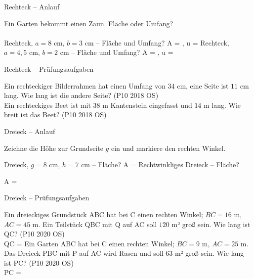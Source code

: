 \setcounter{aufgabe}{0}

\begin{aufgabe}{Rechteck – Anlauf}
\begin{teile}
\teil Ein Garten bekommt einen Zaun. Fläche oder Umfang? \\  \\ 
\teil Rechteck, $a = 8$ cm, $b = 3$ cm – Fläche und Umfang? A = \leerfeld[cm²] , u = \leerfeld[cm]
\teil Rechteck, $a = 4{,}5$ cm, $b = 2$ cm – Fläche und Umfang? A = \leerfeld[cm²] , u = \leerfeld[cm]
\end{teile}
\end{aufgabe}

\begin{aufgabe}{Rechteck – Prüfungsaufgaben}
\begin{teile}
\teil Ein rechteckiger Bilderrahmen hat einen Umfang von $34$ cm, eine Seite ist $11$ cm lang. Wie lang ist die andere Seite? \hfill (P10 2018 OS) \\ \leerfeld[cm]
\teil Ein rechteckiges Beet ist mit $38$ m Kantenstein eingefasst und $14$ m lang. Wie breit ist das Beet? \hfill (P10 2018 OS) \\ \leerfeld[m]
\end{teile}
\end{aufgabe}

\begin{aufgabe}{Dreieck – Anlauf}
\begin{teile}
\teil Zeichne die Höhe zur Grundseite $g$ ein und markiere den rechten Winkel.

\teil Dreieck, $g = 8$ cm, $h = 7$ cm – Fläche? A = \leerfeld[cm²]
\teil Rechtwinkliges Dreieck – Fläche?

A = \leerfeld[cm²]
\end{teile}
\end{aufgabe}

\begin{aufgabe}{Dreieck – Prüfungsaufgaben}
\begin{teile}
\teil Ein dreieckiges Grundstück ABC hat bei C einen rechten Winkel; $BC = 16$ m, $AC = 45$ m. Ein Teilstück QBC mit Q auf AC soll $120$ m² groß sein. Wie lang ist QC? \hfill (P10 2020 OS) \\ QC = \leerfeld[m]
\teil Ein Garten ABC hat bei C einen rechten Winkel; $BC = 9$ m, $AC = 25$ m. Das Dreieck PBC mit P auf AC wird Rasen und soll $63$ m² groß sein. Wie lang ist PC? \hfill (P10 2020 OS) \\ PC = \leerfeld[m]
\end{teile}
\end{aufgabe}

